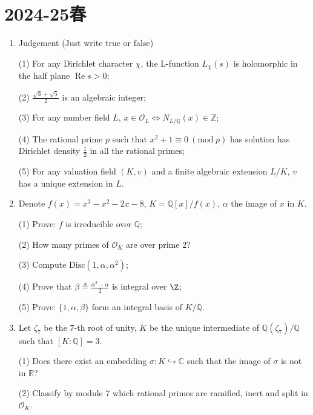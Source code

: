 
\section{2024-25春}
\begin{enumerate}
\item Judgement (Just write true or false)

(1) For any Dirichlet character $\chi$, the L-function $L_{\chi}(s)$ is holomorphic in the half plane $\operatorname{Re} s > 0$;

(2) $\frac{\sqrt3 + \sqrt 5}{2}$ is an algebraic integer;

(3) For any number field $L$, $x\in \mathcal{O}_L \Leftrightarrow N_{L/\mathbb{Q}}(x) \in \mathbb{Z}$;

(4) The rational prime $p$ such that $x^2+1 \equiv 0 \ (\mathrm{mod} \ p)$ has solution has Dirichlet density $\frac12$ in all the rational primes;

(5) For any valuation field $(K,v)$ and a finite algebraic extension $L/K$, $v$ has a unique extension in $L$.

\item Denote $f(x) = x^3 - x^2 - 2x - 8 $, $K = \mathbb{Q} [x]/ f(x)$, $\alpha$ the image of $x$ in $K$.

(1) Prove: $f$ is irreducible over $\mathbb{Q}$;

(2) How many primes of $\mathcal{O}_K$ are over prime $2$?

(3) Compute $\mathrm{Disc}(1, \alpha, \alpha^2)$;

(4) Prove that $\beta \triangleq \frac{\alpha^2 - \alpha}{2} $ is integral over $\Z$;

(5) Prove: $\{1, \alpha, \beta\}$ form an integral basis of $K/\mathbb{Q}$.

\item Let $\zeta_7$ be the $7$-th root of unity, $K$ be the unique intermediate of $\mathbb{Q}(\zeta_7)/\mathbb{Q}$ such that $[K: \mathbb{Q}] = 3$.

(1) Does there exist an embedding $\sigma:K \hookrightarrow \mathbb{C}$ such that the image of $\sigma$ is not in $\mathbb{R}$? 

(2) Classify by module $7$ which rational primes are ramified, inert and split in $\mathcal{O}_K$.


\end{enumerate}
